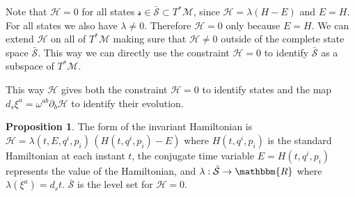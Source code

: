 \documentclass[aps,pra,10pt,twocolumn,floatfix,nofootinbib]{revtex4-1}
\numberwithin{equation}{section}
\theoremstyle{definition}
\newtheorem{prop}[equation]{Proposition}
\begin{document}
Note that $\mathcal{H}=0$ for all states $\mathcal{s} \in \bar{\mathcal{S}} \subset T^* \mathcal{M}$, since $\mathcal{H}=\lambda(H-E)$ and $E = H$. For all states we also have $\lambda \neq 0$. Therefore $\mathcal{H}=0$ only because $E = H$. We can extend $\mathcal{H}$ on all of $T^* \mathcal{M}$ making sure that $\mathcal{H} \neq 0$ outside of the complete state space $\bar{\mathcal{S}}$. This way we can directly use the constraint $\mathcal{H}=0$ to identify $\bar{\mathcal{S}}$ as a subspace of $T^* \mathcal{M}$.

This way $\mathcal{H}$ gives both the constraint $\mathcal{H}=0$ to identify states and the map $d_s \xi^a=\omega^{ab} \partial_b \mathcal{H}$ to identify their evolution.

\begin{prop}\label{form_of_extended_hamiltonian}
	The form of the invariant Hamiltonian is $\mathcal{H} = \lambda(t,E,q^i,p_i) \, (H(t,q^i,p_i) - E)$ where $H(t,q^i,p_i)$ is the standard Hamiltonian at each instant $t$, the conjugate time variable $E = H(t,q^i,p_i)$ represents the value of the Hamiltonian, and  $\lambda : \bar{\mathcal{S}} \rightarrow \mathbbm{R}$ where $\lambda(\xi^a) = d_s t$. $\bar{\mathcal{S}}$ is the level set for $\mathcal{H} = 0$.
\end{prop}
\end{document}
